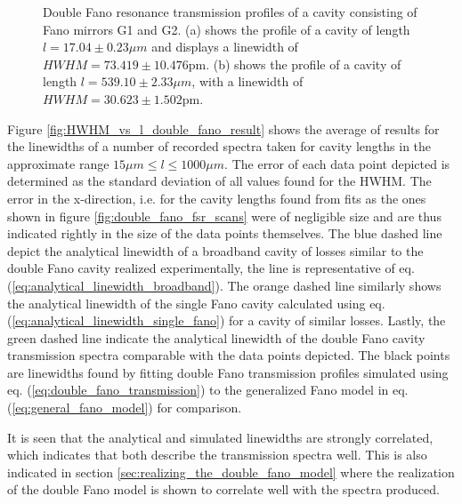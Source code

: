 \begin{figure}[h!]
\begin{subfigure}[b]{0.49\textwidth}
        \caption{}
        \label{fig:long_double_fano_trans}
    \end{subfigure}
    \caption{Double Fano resonance transmission profiles of a cavity consisting of Fano mirrors G1 and G2. (a) shows the profile of a cavity of length $l = 17.04 \pm 0.23 \mu m$ and displays a linewidth of $HWHM = 73.419 \pm 10.476$pm. (b) shows the profile of a cavity of length $l = 539.10 \pm 2.33 \mu m$, with a linewidth of $HWHM = 30.623 \pm 1.502$pm.}
    \label{fig:double_fano_trans_data}
\end{figure}

Figure \ref{fig:HWHM_vs_l_double_fano_result} shows the average of results for the linewidths of a number of recorded spectra taken for cavity lengths in the approximate range $15 \mu m \leq l \leq 1000 \mu m$. The error of each data point depicted is determined as the standard deviation of all values found for the HWHM. The error in the x-direction, i.e. for the cavity lengths found from fits as the ones shown in figure \ref{fig:double_fano_fsr_scans} were of negligible size and are thus indicated rightly in the size of the data points themselves. The blue dashed line depict the analytical linewidth of a broadband cavity of losses similar to the double Fano cavity realized experimentally, the line is representative of eq. (\ref{eq:analytical_linewidth_broadband}). The orange dashed line similarly shows the analytical linewidth of the single Fano cavity calculated using eq. (\ref{eq:analytical_linewidth_single_fano}) for a cavity of similar losses. Lastly, the green dashed line indicate the analytical linewidth of the double Fano cavity transmission spectra comparable with the data points depicted. The black points are linewidths found by fitting double Fano transmission profiles simulated using eq. (\ref{eq:double_fano_transmission}) to the generalized Fano model in eq. (\ref{eq:general_fano_model}) for comparison.

It is seen that the analytical and simulated linewidths are strongly correlated, which indicates that both describe the transmission spectra well. This is also indicated in section \ref{sec:realizing_the_double_fano_model} where the realization of the double Fano model is shown to correlate well with the spectra produced. 

